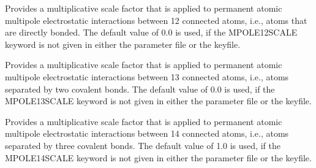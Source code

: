 \documentclass[letterpaper,11pt,english]{sphinxmanual}
\begin{document}

















  Provides a multiplicative scale factor that is applied to permanent atomic multipole electrostatic interactions between 1\sphinxhyphen{}2 connected atoms, i.e., atoms that are directly bonded. The default value of 0.0 is used, if the MPOLE\sphinxhyphen{}12\sphinxhyphen{}SCALE keyword is not given in either the parameter file or the keyfile.

  Provides a multiplicative scale factor that is applied to permanent atomic multipole  electrostatic interactions between 1\sphinxhyphen{}3 connected atoms, i.e., atoms separated by two covalent bonds. The default value of 0.0 is used, if the MPOLE\sphinxhyphen{}13\sphinxhyphen{}SCALE keyword is not given in either the parameter file or the keyfile.

  Provides a multiplicative scale factor that is applied to permanent atomic multipole  electrostatic interactions between 1\sphinxhyphen{}4 connected atoms, i.e., atoms separated by three covalent bonds. The default value of 1.0 is used, if the MPOLE\sphinxhyphen{}14\sphinxhyphen{}SCALE keyword is not given in either the parameter file or the keyfile.
\end{document}
